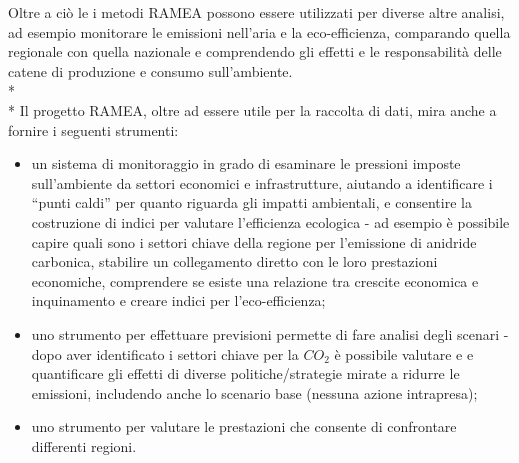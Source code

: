 \documentclass[12pt,a4paper,openright,twoside]{report}
\begin{document}
Oltre a ciò le i metodi RAMEA possono essere utilizzati per diverse altre analisi, ad esempio monitorare le emissioni nell'aria e la eco-efficienza, comparando quella regionale con quella nazionale e comprendendo gli effetti e le responsabilità delle catene di produzione e consumo sull'ambiente. \\*\\*
Il progetto RAMEA, oltre ad essere utile per la raccolta di dati, mira anche a fornire i seguenti strumenti:
\begin{itemize}
\item un sistema di monitoraggio in grado di esaminare le pressioni imposte sull'ambiente da settori economici e infrastrutture, aiutando a identificare i ``punti caldi'' per quanto riguarda gli impatti ambientali, e consentire la costruzione di indici per valutare l'efficienza ecologica - ad esempio è possibile capire quali sono i settori chiave della regione per l'emissione di anidride carbonica, stabilire un collegamento diretto con le loro prestazioni economiche, comprendere se esiste una relazione tra crescite economica e inquinamento e creare indici per l'eco-efficienza;
\item uno strumento per effettuare previsioni permette di fare analisi degli scenari - dopo aver identificato i settori chiave per la $CO_2$ è possibile valutare e e quantificare gli effetti di diverse politiche/strategie mirate a ridurre le emissioni, includendo anche lo scenario base (nessuna azione intrapresa);
\item uno strumento per valutare le prestazioni che consente di confrontare differenti regioni. 
\end{itemize}
 
\end{document}
